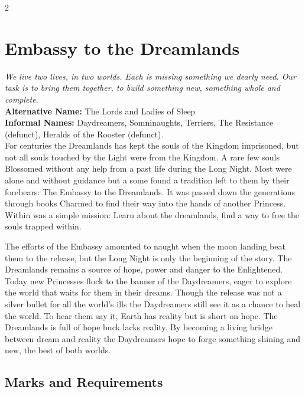 \begin{multicols}{2}
\section*{Embassy to the Dreamlands}
\label{sec:EmbassyDreamlands}

\textit{We live two lives, in two worlds. Each is missing something we dearly need. Our task is to bring them together, to build something new, something  whole and complete.}\\

\noindent \textbf{Alternative Name:} The Lords and Ladies of Sleep \\

\noindent \textbf{Informal Names:} Daydreamers, Somninaughts, Terriers, The Resistance (defunct), Heralds of the Rooster (defunct).\\

\noindent For centuries the Dreamlands has kept the souls of the Kingdom imprisoned, but not all souls touched by the Light were from the Kingdom. A rare few souls Blossomed without any help from a past life during the Long Night. Most were alone and without guidance but a some found a tradition left to them by their forebears: The Embassy to the Dreamlands. It was passed down the generations through books Charmed to find their way into the hands of another Princess. Within was a simple mission: Learn about the dreamlands, find a way to free the souls trapped within.

The efforts of the Embassy amounted to naught when the moon landing beat them to the release, but the Long Night is only the beginning of the story. The Dreamlands remains a source of hope, power and danger to the Enlightened. Today new Princesses flock to the banner of the Daydreamers, eager to explore the world that waits for them in their dreams. Though the release was not a silver bullet for all the world's ills the Daydreamers still see it as a chance to heal the world. To hear them say it, Earth has reality but is short on hope. The Dreamlands is full of hope buck lacks reality. By becoming a living bridge between dream and reality the Daydreamers hope to forge something shining and new, the best of both worlds.

\subsection*{Marks and Requirements}


\end{multicols}
